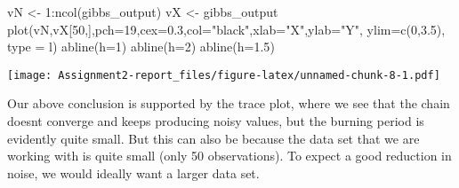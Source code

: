 \documentclass[
]{article}
\newenvironment{Shaded}{\begin{snugshade}}{\end{snugshade}}
\newcommand{\AttributeTok}[1]{\textcolor[rgb]{0.77,0.63,0.00}{#1}}
\newcommand{\DecValTok}[1]{\textcolor[rgb]{0.00,0.00,0.81}{#1}}
\newcommand{\FloatTok}[1]{\textcolor[rgb]{0.00,0.00,0.81}{#1}}
\newcommand{\FunctionTok}[1]{\textcolor[rgb]{0.00,0.00,0.00}{#1}}
\newcommand{\NormalTok}[1]{#1}
\newcommand{\OtherTok}[1]{\textcolor[rgb]{0.56,0.35,0.01}{#1}}
\newcommand{\SpecialCharTok}[1]{\textcolor[rgb]{0.00,0.00,0.00}{#1}}
\newcommand{\StringTok}[1]{\textcolor[rgb]{0.31,0.60,0.02}{#1}}
\begin{document}
\begin{Shaded}
\begin{Highlighting}[]
\NormalTok{vN }\OtherTok{\textless{}{-}} \DecValTok{1}\SpecialCharTok{:}\FunctionTok{ncol}\NormalTok{(gibbs\_output)}
\NormalTok{vX }\OtherTok{\textless{}{-}}\NormalTok{ gibbs\_output}
\FunctionTok{plot}\NormalTok{(vN,vX[}\DecValTok{50}\NormalTok{,],}\AttributeTok{pch=}\DecValTok{19}\NormalTok{,}\AttributeTok{cex=}\FloatTok{0.3}\NormalTok{,}\AttributeTok{col=}\StringTok{"black"}\NormalTok{,}\AttributeTok{xlab=}\StringTok{"X"}\NormalTok{,}\AttributeTok{ylab=}\StringTok{"Y"}\NormalTok{, }\AttributeTok{ylim=}\FunctionTok{c}\NormalTok{(}\DecValTok{0}\NormalTok{,}\FloatTok{3.5}\NormalTok{), }\AttributeTok{type =} \StringTok{\textquotesingle{}l\textquotesingle{}}\NormalTok{)}
\FunctionTok{abline}\NormalTok{(}\AttributeTok{h=}\DecValTok{1}\NormalTok{)}
\FunctionTok{abline}\NormalTok{(}\AttributeTok{h=}\DecValTok{2}\NormalTok{)}
\FunctionTok{abline}\NormalTok{(}\AttributeTok{h=}\FloatTok{1.5}\NormalTok{)}
\end{Highlighting}
\end{Shaded}

\texttt{[image: Assignment2-report\_files/figure-latex/unnamed-chunk-8-1.pdf]}

Our above conclusion is supported by the trace plot, where we see that
the chain doesnt converge and keeps producing noisy values, but the
burning period is evidently quite small. But this can also be because
the data set that we are working with is quite small (only 50
observations). To expect a good reduction in noise, we would ideally
want a larger data set.
\end{document}
